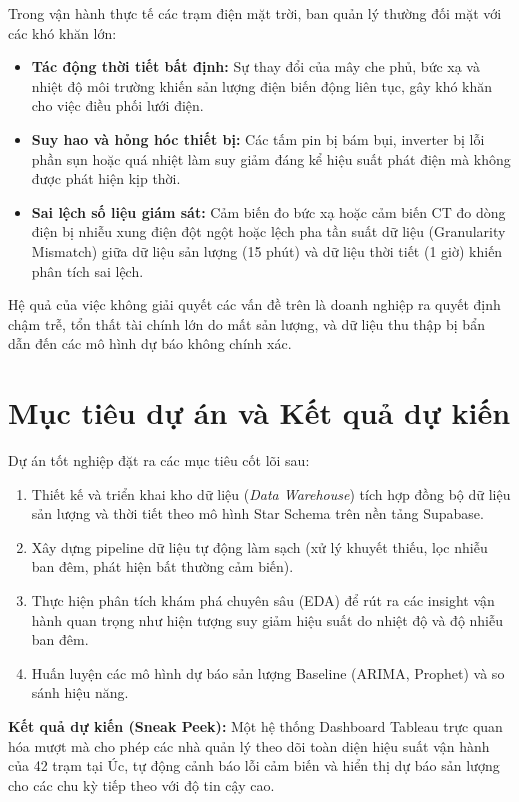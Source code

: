\documentclass[12pt, a4paper]{report}
\begin{document}
Trong vận hành thực tế các trạm điện mặt trời, ban quản lý thường đối mặt với các khó khăn lớn:
\begin{itemize}[noitemsep]
    \item \textbf{Tác động thời tiết bất định:} Sự thay đổi của mây che phủ, bức xạ và nhiệt độ môi trường khiến sản lượng điện biến động liên tục, gây khó khăn cho việc điều phối lưới điện.
    \item \textbf{Suy hao và hỏng hóc thiết bị:} Các tấm pin bị bám bụi, inverter bị lỗi phần sụn hoặc quá nhiệt làm suy giảm đáng kể hiệu suất phát điện mà không được phát hiện kịp thời.
    \item \textbf{Sai lệch số liệu giám sát:} Cảm biến đo bức xạ hoặc cảm biến CT đo dòng điện bị nhiễu xung điện đột ngột hoặc lệch pha tần suất dữ liệu (Granularity Mismatch) giữa dữ liệu sản lượng (15 phút) và dữ liệu thời tiết (1 giờ) khiến phân tích sai lệch.
\end{itemize}
Hệ quả của việc không giải quyết các vấn đề trên là doanh nghiệp ra quyết định chậm trễ, tổn thất tài chính lớn do mất sản lượng, và dữ liệu thu thập bị bẩn dẫn đến các mô hình dự báo không chính xác.

\section{Mục tiêu dự án và Kết quả dự kiến}
\label{sec:muctieu}

Dự án tốt nghiệp đặt ra các mục tiêu cốt lõi sau:
\begin{enumerate}[noitemsep]
    \item Thiết kế và triển khai kho dữ liệu (\textit{Data Warehouse}) tích hợp đồng bộ dữ liệu sản lượng và thời tiết theo mô hình Star Schema trên nền tảng Supabase.
    \item Xây dựng pipeline dữ liệu tự động làm sạch (xử lý khuyết thiếu, lọc nhiễu ban đêm, phát hiện bất thường cảm biến).
    \item Thực hiện phân tích khám phá chuyên sâu (EDA) để rút ra các insight vận hành quan trọng như hiện tượng suy giảm hiệu suất do nhiệt độ và độ nhiễu ban đêm.
    \item Huấn luyện các mô hình dự báo sản lượng Baseline (ARIMA, Prophet) và so sánh hiệu năng.
\end{enumerate}
\textbf{Kết quả dự kiến (Sneak Peek):} Một hệ thống Dashboard Tableau trực quan hóa mượt mà cho phép các nhà quản lý theo dõi toàn diện hiệu suất vận hành của 42 trạm tại Úc, tự động cảnh báo lỗi cảm biến và hiển thị dự báo sản lượng cho các chu kỳ tiếp theo với độ tin cậy cao.
\end{document}
